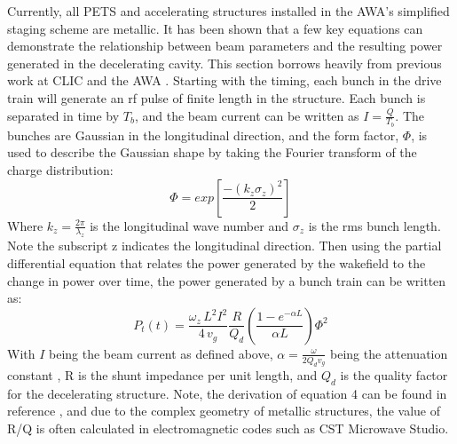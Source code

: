 Currently, all  PETS and accelerating structures installed in the AWA's
simplified staging scheme are metallic. It has been shown that a few
key equations can demonstrate the relationship between beam parameters
and the resulting power generated in the decelerating cavity. This section
borrows heavily from previous work at CLIC and the AWA \cite{CLICdesignReport,WeiPaper}. 
Starting with the timing, each bunch in the drive train will generate
an rf pulse of finite length in the structure. Each bunch is separated
in time by $T_{b}$, and the  beam current can be written as $I=\frac{Q}{T_{b}}$.
 The bunches are Gaussian in the longitudinal direction, and the form
factor, $\Phi$, is used to describe the Gaussian shape by taking
the Fourier transform of the charge distribution: 
\begin{equation}
\Phi=exp\left[\frac{-(k_{z}\sigma_{z})^{2}}{2}\right]
\end{equation}
Where $k_{z}=\frac{2\pi}{\lambda_{z}}$ is the longitudinal wave number
and $\sigma_{z}$ is the rms bunch length.   Note the subscript z indicates the longitudinal
direction. Then using the partial differential equation that relates
the power generated by the wakefield to the change in power over time, 
the power generated by a bunch train can be written as:
\begin{equation} \label{eq:rfpower}
P_{t}(t)=\frac{\omega_{z}\,L^{2}I^{2}}{4\,v_{g}}\frac{R}{Q_{d}}\left(\frac{1-e^{-\alpha L}}{\alpha L}\right)\Phi^{2}
\end{equation}
With $I$ being the beam current as defined above, $\alpha=\frac{\omega}{2Q_{d}v_{g}}$
being the attenuation constant \cite{pozar}, R is the shunt impedance
per unit length, and $Q_{d}$ is the quality factor for the decelerating
structure.  Note, the derivation of equation 4 can be found in reference
\cite{PETSeq}, and due to the complex geometry of metallic structures,
the value of R/Q is often calculated in electromagnetic codes such
as CST Microwave Studio. 



